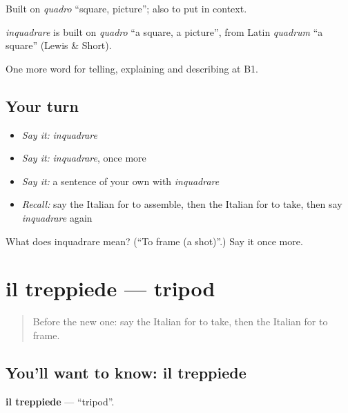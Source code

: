 Built on \emph{quadro} \textquotedblleft{}square, picture\textquotedblright{}; also to put in context.

\begin{cousinweb}
\emph{inquadrare} is built on \emph{quadro} \textquotedblleft{}a square, a picture\textquotedblright{}, from Latin \emph{quadrum} \textquotedblleft{}a square\textquotedblright{} (Lewis \& Short).
\end{cousinweb}

\begin{grammarlens}[title={What you've built}]
One more word for telling, explaining and describing at B1.
\end{grammarlens}

\subsection*{Your turn}
\begin{itemize}
\raggedright
  \item \emph{Say it:} \emph{inquadrare}
  \item \emph{Say it:} \emph{inquadrare}, once more
  \item \emph{Say it:} a sentence of your own with \emph{inquadrare}
  \item \emph{Recall:} say the Italian for to assemble, then the Italian for to take, then say \emph{inquadrare} again
\end{itemize}

\begin{tcolorbox}[breakable,colback=teal!4,colframe=teal!35!black,title={Before you move on}]
What does inquadrare mean? (\textquotedblleft{}To frame (a shot)\textquotedblright{}.) Say it once more.
\end{tcolorbox}
\section[il treppiede]{il treppiede — tripod}

\label{lesson:IT-C506-treppiede}



\begin{quote}
Before the new one: say the Italian for to take, then the Italian for to frame.
\end{quote}

\subsection*{You'll want to know: il treppiede}
\textbf{il treppiede} — \textquotedblleft{}tripod\textquotedblright{}.

